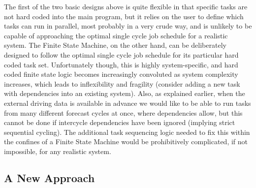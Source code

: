 \documentclass[11pt,a4paper]{article}
\begin{document}
The first of the two basic designs above is quite flexible in that
specific tasks are not hard coded into the main program, but it relies
on the user to define which tasks can run in parallel, most probably in
a very crude way, and is unlikely to be capable of approaching the
optimal single cycle job schedule for a realistic system.  The Finite
State Machine, on the other hand, can be deliberately designed to follow
the optimal single cycle job schedule for its particular hard coded task
set. Unfortunately though, this is highly system-specific, and hard
coded finite state logic becomes increasingly convoluted as system
complexity increases, which leads to inflexibility and fragility
(consider adding a new task with dependencies into an existing system).
Also, as explained earlier, when the external driving data is available
in advance we would like to be able to run tasks from many different
forecast cycles at once, where dependencies allow, but this cannot be
done if intercycle dependencies have been ignored (implying strict
sequential cycling). The additional task sequencing logic needed to fix
this within the confines of a Finite State Machine would be
prohibitively complicated, if not impossible, for any realistic system.


\subsection{A New Approach} 
\end{document}
